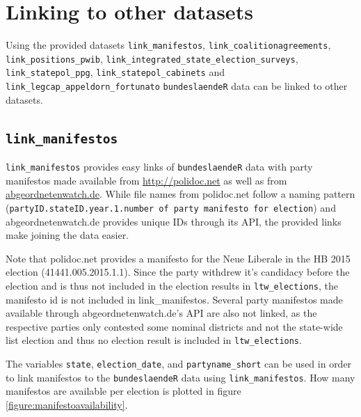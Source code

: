 \documentclass[
  a4paper,
  DIV=11,
  numbers=noendperiod]{scrartcl}
\begin{document}
\clearpage

\section{Linking to other datasets}\label{linking-to-other-datasets}

Using the provided datasets \texttt{link\_manifestos},
\texttt{link\_coalitionagreements}, \texttt{link\_positions\_pwib},
\texttt{link\_integrated\_state\_election\_surveys},
\texttt{link\_statepol\_ppg}, \texttt{link\_statepol\_cabinets} and
\texttt{link\_legcap\_appeldorn\_fortunato} \texttt{bundeslaendeR} data
can be linked to other datasets.

\subsection{\texorpdfstring{\texttt{link\_manifestos}}{link\_manifestos}}\label{link_manifestos}

\texttt{link\_manifestos} provides easy links of \texttt{bundeslaendeR}
data with party manifestos made available from \url{http://polidoc.net}
\parencites{benoitChallengesEstimatingPolicy2009}{grossDoesEURegional2018}{pappiPolitikpositionenDeutschenLandtagsparteien2014}{pappiPartyElectionProgrammes2009}[for the codebook see][]{brauningerPolidocnetCodebook2018}
as well as from \url{abgeordnetenwatch.de}. While file names from
polidoc.net follow a naming pattern
(\texttt{{partyID}.{stateID}.{year}.{1}.{number of party manifesto for election}})
and abgeordnetenwatch.de provides unique IDs through its API, the
provided links make joining the data easier.

Note that polidoc.net provides a manifesto for the Neue Liberale in the
HB 2015 election (41441.005.2015.1.1). Since the party withdrew it's
candidacy before the election and is thus not included in the election
results in \texttt{ltw\_elections}, the manifesto id is not included in
link\_manifestos. Several party manifestos made available through
abgeordnetenwatch.de's API are also not linked, as the respective
parties only contested some nominal districts and not the state-wide
list election and thus no election result is included in
\texttt{ltw\_elections}.

The variables \texttt{state}, \texttt{election\_date}, and
\texttt{partyname\_short} can be used in order to link manifestos to the
\texttt{bundeslaendeR} data using \texttt{link\_manifestos}. How many
manifestos are available per election is plotted in
figure\(~\)\ref{figure:manifestoavailability}.
\end{document}
